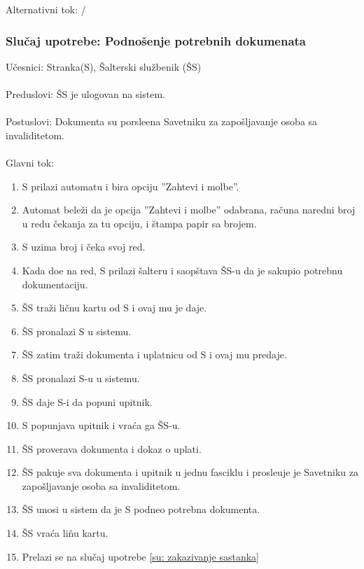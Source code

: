 \noindent Alternativni tok: /


\subsubsection{Slu\v caj upotrebe: Podno\v senje potrebnih dokumenata}

\label{su: podnosenje dokumenata}

\noindent U\v cesnici: Stranka(S), \v Salterski slu\v zbenik (\v SS)
\\
\\ Preduslovi: \v SS je ulogovan na sistem.
\\
\\ Postuslovi: Dokumenta su porsle\dj ena Savetniku za zapo\v sljavanje osoba sa invaliditetom.
\\
\\ Glavni tok:
\begin{enumerate}
	\item S prilazi automatu i bira opciju ''Zahtevi i molbe''.
	\item Automat bele\v zi da je opcija ''Zahtevi i molbe'' odabrana, ra\v cuna naredni broj u redu \v cekanja za tu opciju, i \v stampa papir sa brojem.
	\item S uzima broj i \v ceka svoj red.
	\item Kada do\dj e na red, S prilazi \v salteru i saop\v stava \v SS-u da je sakupio potrebnu dokumentaciju.
	\item \v SS tra\v zi li\v cnu kartu od S i ovaj mu je daje.
	\item \v SS pronalazi S u sistemu.
	\item \v SS zatim tra\v zi dokumenta i uplatnicu od S i ovaj mu predaje.
	\item \v SS pronalazi S-u u sistemu.
	\item \v SS daje S-i da popuni upitnik.
	\item S popunjava upitnik i vra\' ca ga \v SS-u.
	\item \v SS proverava dokumenta i dokaz o uplati.
	\item \v SS pakuje sva dokumenta i upitnik u jednu fasciklu i prosle\dj uje je Savetniku za zapo\v sljavanje osoba sa invaliditetom.
	\item \v SS unosi u sistem da je S podneo potrebna dokumenta.
	\item \v SS vra\' ca li\v nu kartu.
	\item Prelazi se na slu\v caj upotrebe \ref{su: zakazivanje sastanka}
\end{enumerate}

